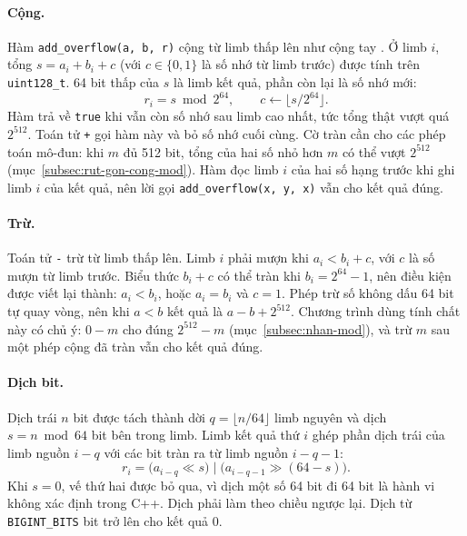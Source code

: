 \paragraph{Cộng.} Hàm \texttt{add\_overflow(a, b, r)} cộng từ limb thấp lên như cộng tay \cite{knuth1997art}. Ở limb $i$, tổng $s = a_i + b_i + c$ (với $c \in \{0, 1\}$ là số nhớ từ limb trước) được tính trên \texttt{uint128\_t}. 64 bit thấp của $s$ là limb kết quả, phần còn lại là số nhớ mới:
\begin{equation}
r_i = s \bmod 2^{64}, \qquad c \leftarrow \lfloor s / 2^{64} \rfloor .
\end{equation}
Hàm trả về \texttt{true} khi vẫn còn số nhớ sau limb cao nhất, tức tổng thật vượt quá $2^{512}$. Toán tử \texttt{+} gọi hàm này và bỏ số nhớ cuối cùng. Cờ tràn cần cho các phép toán mô-đun: khi $m$ đủ 512 bit, tổng của hai số nhỏ hơn $m$ có thể vượt $2^{512}$ (mục~\ref{subsec:rut-gon-cong-mod}). Hàm đọc limb $i$ của hai số hạng trước khi ghi limb $i$ của kết quả, nên lời gọi \texttt{add\_overflow(x, y, x)} vẫn cho kết quả đúng.

\paragraph{Trừ.} Toán tử \texttt{-} trừ từ limb thấp lên. Limb $i$ phải mượn khi $a_i < b_i + c$, với $c$ là số mượn từ limb trước. Biểu thức $b_i + c$ có thể tràn khi $b_i = 2^{64} - 1$, nên điều kiện được viết lại thành: $a_i < b_i$, hoặc $a_i = b_i$ và $c = 1$. Phép trừ số không dấu 64 bit tự quay vòng, nên khi $a < b$ kết quả là $a - b + 2^{512}$. Chương trình dùng tính chất này có chủ ý: $0 - m$ cho đúng $2^{512} - m$ (mục~\ref{subsec:nhan-mod}), và trừ $m$ sau một phép cộng đã tràn vẫn cho kết quả đúng.

\paragraph{Dịch bit.} Dịch trái $n$ bit được tách thành dời $q = \lfloor n/64 \rfloor$ limb nguyên và dịch $s = n \bmod 64$ bit bên trong limb. Limb kết quả thứ $i$ ghép phần dịch trái của limb nguồn $i - q$ với các bit tràn ra từ limb nguồn $i - q - 1$:
\begin{equation}
r_i = \big(a_{i-q} \ll s\big) \;\big|\; \big(a_{i-q-1} \gg (64 - s)\big).
\end{equation}
Khi $s = 0$, vế thứ hai được bỏ qua, vì dịch một số 64 bit đi 64 bit là hành vi không xác định trong C++. Dịch phải làm theo chiều ngược lại. Dịch từ \texttt{BIGINT\_BITS} bit trở lên cho kết quả 0.

